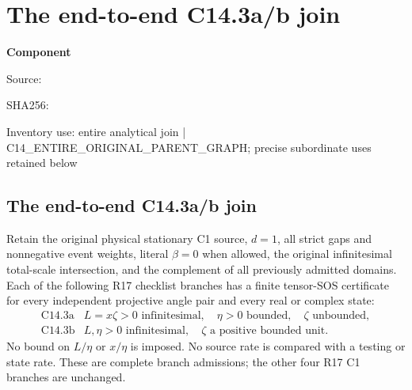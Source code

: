 \chapter{The end-to-end C14.3a/b join}
\label{component:pfaf149c34810}
\noindent\textbf{Component }\par
{\small\noindent Source: \par}
{\small\noindent SHA256: \par}
{\small\noindent Inventory use: entire analytical join | C14\_\allowbreak{}ENTIRE\_\allowbreak{}ORIGINAL\_\allowbreak{}PARENT\_\allowbreak{}GRAPH; precise subordinate uses retained below\par}
\medskip
\section{The end-to-end C14.3a/b join}
\label{pfaf149c34810:sec:r18-c143ab-join}

\begin{theorem}
Retain the original physical stationary C1 source, $d=1$, all strict
gaps and nonnegative event weights, literal $\beta=0$ when allowed,
the original infinitesimal total-scale intersection, and the
complement of all previously admitted domains.  Each of the following
R17 checklist branches has a finite tensor-SOS certificate for every
independent projective angle pair and every real or complex state:
\[
\begin{array}{c|l}
 \mathrm{C14.3a}&L=x\zeta>0\text{ infinitesimal},\quad
          \eta>0\text{ bounded},\quad\zeta\text{ unbounded},\\
 \mathrm{C14.3b}&L,\eta>0\text{ infinitesimal},\quad
          \zeta\text{ a positive bounded unit}.
\end{array}
\]
No bound on $L/\eta$ or $x/\eta$ is imposed.  No source rate is
compared with a testing or state rate.  These are complete branch
admissions; the other four R17 C1 branches are unchanged.
\end{theorem}

